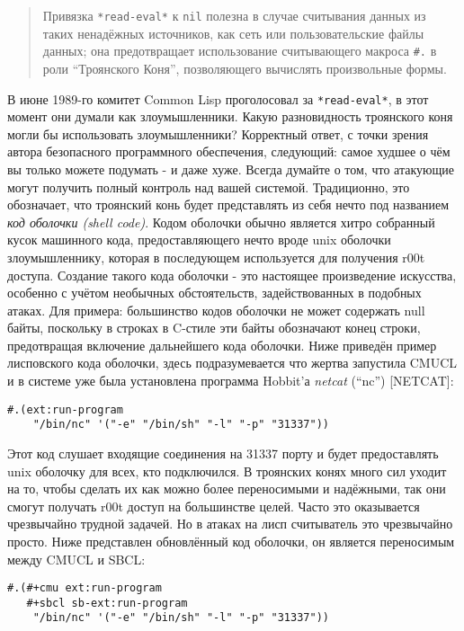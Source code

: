 \begin{quote}
Привязка \verb"*read-eval*" к \verb"nil" полезна в случае считывания данных из таких ненадёжных источников, как сеть или пользовательские файлы данных; она предотвращает использование считывающего макроса \verb"#." в роли ``Троянского Коня'', позволяющего вычислять произвольные формы.
\end{quote}

В июне 1989-го комитет Common Lisp проголосовал за \verb"*read-eval*", в этот момент они думали как злоумышленники. Какую разновидность троянского коня могли бы использовать злоумышленники? Корректный ответ, с точки зрения автора безопасного программного обеспечения, следующий: самое худшее о чём вы только можете подумать - и даже хуже. Всегда думайте о том, что атакующие могут получить полный контроль над вашей системой. Традиционно, это обозначает, что троянский конь будет представлять из себя нечто под названием \emph{код оболочки (shell code)}. Кодом оболочки обычно является хитро собранный кусок машинного кода, предоставляющего нечто вроде unix оболочки злоумышленнику, которая в последующем используется для получения r00t доступа. Создание такого кода оболочки - это настоящее произведение искусства, особенно с учётом необычных обстоятельств, задействованных в подобных атаках. Для примера: большинство кодов оболочки не может содержать null байты, поскольку в строках в C-стиле эти байты обозначают конец строки, предотвращая включение дальнейшего кода оболочки. Ниже приведён пример лисповского кода оболочки, здесь подразумевается что жертва запустила CMUCL и в системе уже была установлена программа Hobbit'а \emph{netcat} (``nc'') [NETCAT]:

\begin{verbatim}
#.(ext:run-program
    "/bin/nc" '("-e" "/bin/sh" "-l" "-p" "31337"))
\end{verbatim}

Этот код слушает входящие соединения на 31337 порту и будет предоставлять unix оболочку для всех, кто подключился. В троянских конях много сил уходит на то, чтобы сделать их как можно более переносимыми и надёжными, так они смогут получать r00t доступ на большинстве целей. Часто это оказывается чрезвычайно трудной задачей. Но в атаках на лисп считыватель это чрезвычайно просто. Ниже представлен обновлённый код оболочки, он является переносимым между CMUCL и SBCL:

\begin{verbatim}
#.(#+cmu ext:run-program
   #+sbcl sb-ext:run-program
    "/bin/nc" '("-e" "/bin/sh" "-l" "-p" "31337"))
\end{verbatim}

